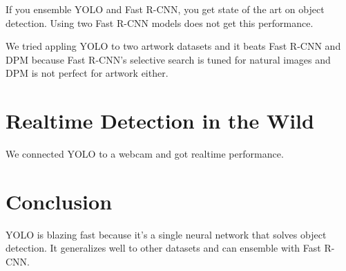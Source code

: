 \documentclass[a4paper]{article}
\begin{document}
If you ensemble YOLO and Fast R-CNN, you get state of the art on object
detection. Using two Fast R-CNN models does not get this performance.

We tried appling YOLO to two artwork datasets and it beats Fast R-CNN and DPM
because Fast R-CNN's selective search is tuned for natural images and DPM
is not perfect for artwork either.

\section{Realtime Detection in the Wild}
We connected YOLO to a webcam and got realtime performance.

\section{Conclusion}
YOLO is blazing fast because it's a single neural network that solves object
detection. It generalizes well to other datasets and can ensemble with Fast
R-CNN.
\end{document}
